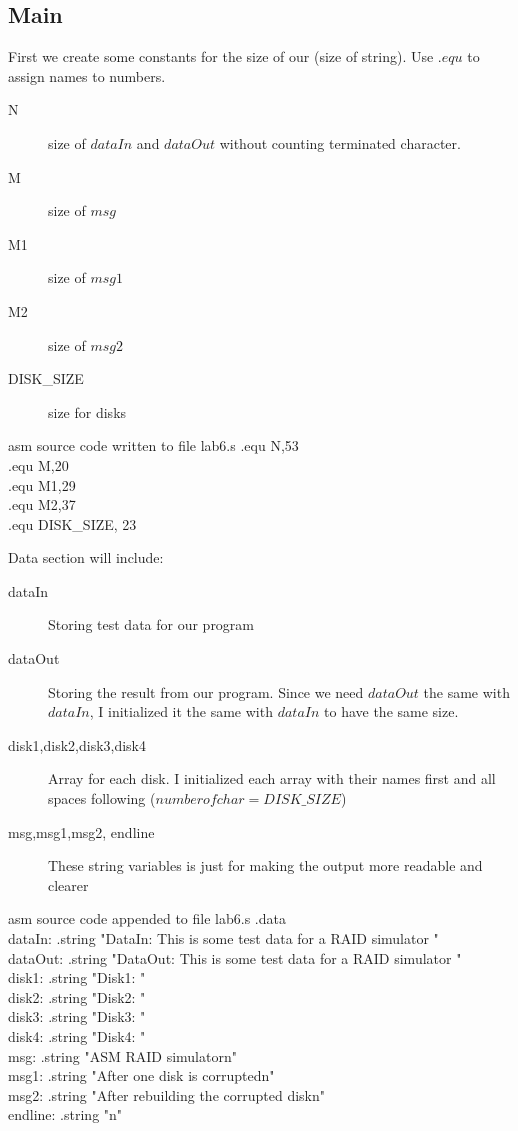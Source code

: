 \documentclass{article}
\begin{document}
\subsection{Main}
First we create some constants for the size of our (size of string). Use $.equ$ to assign names to numbers.
\begin{description}
\item[N]  size of $dataIn$ and $dataOut$ without counting terminated character.
\item[M]  size of $msg$
\item[M1]  size of $msg1$
\item[M2]  size of $msg2$
\item[DISK\_SIZE] size for disks
\end{description}
\begin{GFT}{asm source code written to file lab6.s}
\+.equ N,53	 \\
\+.equ M,20\\
\+.equ M1,29\\
\+.equ M2,37\\
\+.equ DISK\_SIZE, 23\\
\end{GFT}
Data section will include:
\begin{description}
\item[dataIn]  Storing test data for our program
\item[dataOut]  Storing the result from our program. Since we need $dataOut$ the same with $dataIn$, I initialized it the same with $dataIn$ to have the same size.
\item[disk1,disk2,disk3,disk4] Array for each disk. I initialized each array with their names first and all spaces following ($number of char = DISK\_SIZE$)
\item[msg,msg1,msg2, endline] These string variables is just for making the output more readable and clearer  
\end{description}
\clearpage
\begin{GFT}{asm source code appended to file lab6.s}
\+.data\\
\+  dataIn: .string "DataIn: This is some test data for a RAID simulator  "\\
\+  dataOut: .string "DataOut: This is some test data for a RAID simulator  "\\
\+  disk1: .string "Disk1:                 "\\
\+  disk2: .string "Disk2:                 "\\
\+  disk3: .string "Disk3:                 "\\
\+  disk4: .string "Disk4:                 "\\
\+  msg: .string "ASM RAID simulator\Backslash{}n"\\
\+  msg1: .string "After one disk is corrupted\Backslash{}n"\\
\+  msg2: .string "After rebuilding the corrupted disk\Backslash{}n"\\
\+  endline: .string "\Backslash{}n"\\
\end{GFT}
\end{document}
